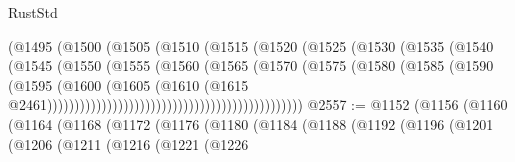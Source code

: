 \begin{lexlean}{RustStd}
\begin{coremodule}
                                                (@1495
                                                  (@1500
                                                    (@1505
                                                      (@1510
                                                        (@1515
                                                          (@1520
                                                            (@1525
                                                              (@1530
                                                                (@1535
                                                                  (@1540
                                                                    (@1545
                                                                      (@1550
                                                                        (@1555
                                                                          (@1560
                                                                            (@1565
                                                                              (@1570
                                                                                (@1575
                                                                                  (@1580
                                                                                    (@1585
                                                                                      (@1590
                                                                                        (@1595
                                                                                          (@1600
                                                                                            (@1605
                                                                                              (@1610
                                                                                                (@1615
                                                                                                  @2461)))))))))))))))))))))))))))))))))))))))))))))))
@2557 := @1152
    (@1156
      (@1160
        (@1164
          (@1168
            (@1172
              (@1176
                (@1180
                  (@1184
                    (@1188
                      (@1192
                        (@1196
                          (@1201
                            (@1206
                              (@1211
                                (@1216
                                  (@1221
                                    (@1226

\end{coremodule}
\end{lexlean}
